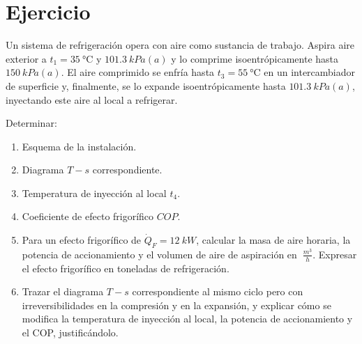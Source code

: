 \section{Ejercicio}\label{ej:Chap11Ejercicio17}
Un sistema de refrigeración opera con aire como sustancia de trabajo. Aspira aire exterior a $t_1 = \SI{35}{\celsius}$ y $\SI{101.3}{kPa(a)}$ y lo comprime isoentrópicamente hasta $\SI{150}{kPa(a)}$. El aire comprimido se enfría hasta $t_3 = \SI{55}{\celsius}$ en un intercambiador de superficie y, finalmente, se lo expande isoentrópicamente hasta $\SI{101.3}{kPa(a)}$, inyectando este aire al local a refrigerar.

Determinar:
\begin{enumerate}
    \item Esquema de la instalación.
    \item Diagrama $T-s$ correspondiente.
    \item Temperatura de inyección al local $t_4$.
    \item Coeficiente de efecto frigorífico $COP$.
    \item Para un efecto frigorífico de $\dot{Q}_F=\SI{12}{kW}$, calcular la masa de aire horaria, la potencia de accionamiento y el volumen de aire de aspiración en $\SI{}{\frac{m^3}{h}}$. Expresar el efecto frigorífico en toneladas de refrigeración.
    \item Trazar el diagrama $T-s$ correspondiente al mismo ciclo pero con irreversibilidades en la compresión y en la expansión, y explicar cómo se modifica la temperatura de inyección al local, la potencia de accionamiento y el COP, justificándolo.
\end{enumerate}